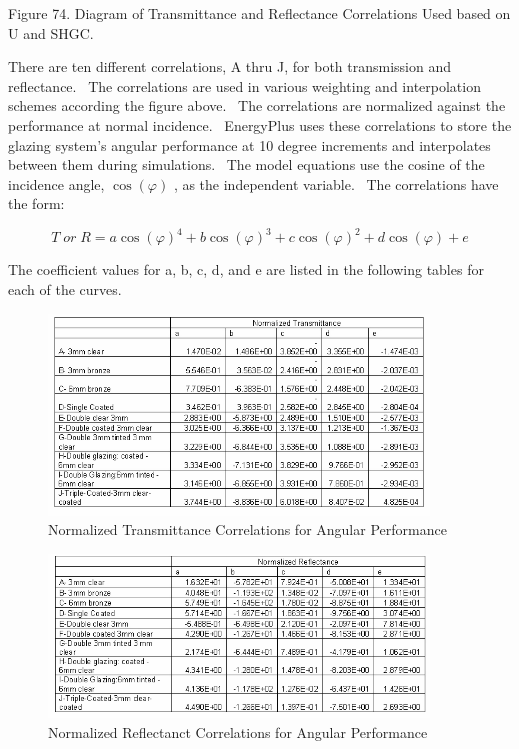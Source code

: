 Figure 74. Diagram of Transmittance and Reflectance Correlations Used based on U and SHGC.

There are ten different correlations, A thru J, for both transmission and reflectance.~ The correlations are used in various weighting and interpolation schemes according the figure above.~ The correlations are normalized against the performance at normal incidence.~ EnergyPlus uses these correlations to store the glazing system's angular performance at 10 degree increments and interpolates between them during simulations.~ The model equations use the cosine of the incidence angle, \(\cos (\varphi )\) , as the independent variable.~ The correlations have the form:

\begin{equation}
T\;or\;R = a\cos {(\varphi )^4} + b\cos {(\varphi )^3} + c\cos {(\varphi )^2} + d\cos (\varphi ) + e
\end{equation}

The coefficient values for a, b, c, d, and e are listed in the following tables for each of the curves.

\begin{figure}[hbtp] %
\centering
\includegraphics[width=0.9\textwidth, height=0.9\textheight, keepaspectratio=true]{media/image950.png}
\caption{Normalized Transmittance Correlations for Angular Performance \protect \label{fig:normalized-transmittance-correlations-for}}
\end{figure}

\begin{figure}[hbtp] %
\centering
\includegraphics[width=0.9\textwidth, height=0.9\textheight, keepaspectratio=true]{media/image951.png}
\caption{Normalized Reflectanct Correlations for Angular Performance \protect \label{fig:normalized-reflectanct-correlations-for}}
\end{figure}

